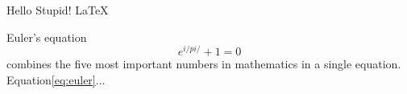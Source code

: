 \documentclass{article}
\begin{document}
Hello Stupid!
\LaTeX

Euler's equation
\begin{equation}
	e^{i/pi/}+1=0 \label{eq:euler}
\end{equation}
combines the five most important numbers in mathematics in a single equation.
Equation\ref{eq:euler}...
\end{document}
